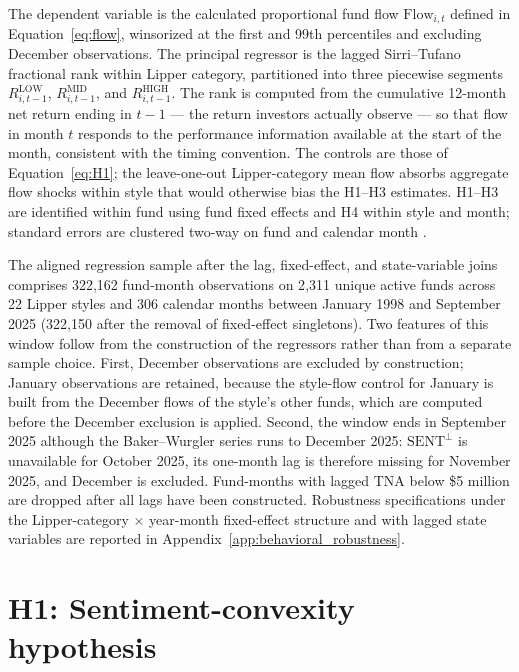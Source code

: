 \documentclass[12pt, oneside]{report}
\renewcommand{\mathrm}[1]{\text{#1}}%
\begin{document}
\noindent The dependent variable is the calculated proportional fund
flow $\text{Flow}_{i,t}$ defined in Equation~\ref{eq:flow},
winsorized at the first and 99th percentiles and excluding December
observations. The principal regressor is the lagged Sirri--Tufano
fractional rank within Lipper category, partitioned into three
piecewise segments $R^{\text{LOW}}_{i,t-1}$, $R^{\text{MID}}_{i,t-1}$,
and $R^{\text{HIGH}}_{i,t-1}$. The rank is computed from the cumulative
12-month net return ending in $t-1$ --- the return investors actually
observe --- so that flow in month $t$ responds to the performance
information available at the start of the month, consistent with the
\textcite{SirriTufano1998} timing convention. The controls are those of
Equation~\ref{eq:H1}; the leave-one-out Lipper-category mean flow absorbs
aggregate flow shocks within style that would otherwise bias the H1--H3
estimates. H1--H3 are identified within fund using fund fixed effects and
H4 within style and month; standard errors are clustered two-way on fund
and calendar month \parencite{Petersen2009}.

The aligned regression sample after the lag, fixed-effect, and
state-variable joins comprises 322{,}162 fund-month observations on
2{,}311 unique active funds across 22 Lipper styles and 306 calendar
months between January 1998 and September 2025 (322{,}150 after the
removal of fixed-effect singletons). Two features of this window follow
from the construction of the regressors rather than from a separate
sample choice. First, December observations are excluded by construction;
January observations are retained, because the style-flow control for
January is built from the December flows of the style's other funds,
which are computed before the December exclusion is applied. Second, the
window ends in September 2025 although the Baker--Wurgler series runs to
December 2025: $\mathrm{SENT}^{\perp}$ is unavailable for October 2025,
its one-month lag is therefore missing for November 2025, and December
is excluded. Fund-months with lagged TNA below \$5 million are dropped
after all lags have been constructed. Robustness specifications under the
Lipper-category $\times$ year-month fixed-effect structure and with
lagged state variables are reported in
Appendix~\ref{app:behavioral_robustness}.

\section{H1: Sentiment-convexity hypothesis}
\label{sec:H1}
\end{document}
